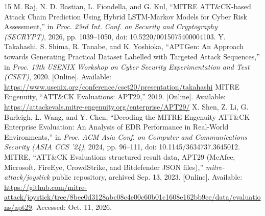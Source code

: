\documentclass[conference]{IEEEtran}
\begin{document}
\begin{thebibliography}{15}
 M. Raj, N. D. Bastian, L. Fiondella, and G. Kul, ``MITRE ATT\&CK-based Attack Chain Prediction Using Hybrid LSTM-Markov Models for Cyber Risk Assessment,'' in \emph{Proc. 23rd Int. Conf. on Security and Cryptography (SECRYPT)}, 2026, pp. 1039--1050, doi: 10.5220/0015075400004103.
 Y. Takahashi, S. Shima, R. Tanabe, and K. Yoshioka, ``APTGen: An Approach towards Generating Practical Dataset Labelled with Targeted Attack Sequences,'' in \emph{Proc. 13th USENIX Workshop on Cyber Security Experimentation and Test (CSET)}, 2020. [Online]. Available: \url{https://www.usenix.org/conference/cset20/presentation/takahashi}
 MITRE Engenuity, ``ATT\&CK Evaluations: APT29,'' 2019. [Online]. Available: \url{https://attackevals.mitre-engenuity.org/enterprise/APT29/}
 X. Shen, Z. Li, G. Burleigh, L. Wang, and Y. Chen, ``Decoding the MITRE Engenuity ATT\&CK Enterprise Evaluation: An Analysis of EDR Performance in Real-World Environments,'' in \emph{Proc. ACM Asia Conf. on Computer and Communications Security (ASIA CCS '24)}, 2024, pp. 96--111, doi: 10.1145/3634737.3645012.
 MITRE, ``ATT\&CK Evaluations structured result data, APT29 (McAfee, Microsoft, FireEye, CrowdStrike, and Bitdefender JSON files),'' \emph{mitre-attack/joystick} public repository, archived Sep. 13, 2023. [Online]. Available: \url{https://github.com/mitre-attack/joystick/tree/8bee0d3128abc08c4e00c60b01c1608e162bb9ce/data/evaluations/apt29}. Accessed: Oct. 11, 2026.
\end{thebibliography}
\end{document}
